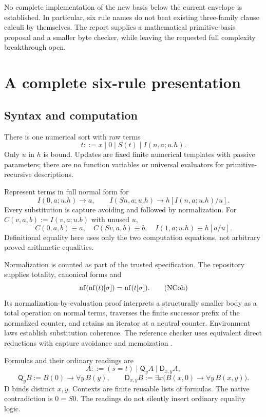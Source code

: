 \documentclass[11pt]{article}
\newcommand{\Q}{\mathsf Q}\newcommand{\D}{\mathsf D}
\begin{document}
No complete implementation of the new basis below the current envelope
is established. In particular, six rule names do not beat existing
three-family clause calculi by themselves. The report supplies a
mathematical primitive-basis proposal and a smaller byte checker, while
leaving the requested full complexity breakthrough open.




\section{A complete six-rule presentation}\label{sec:system}
\subsection{Syntax and computation}
There is one numerical sort with raw terms
\[
 t::=x\mid0\mid S(t)\mid I(n,a;u.h).
\]
Only $u$ in $h$ is bound. Updates are fixed finite numerical templates
with passive parameters; there are no function variables or universal
evaluators for primitive-recursive descriptions.

Represent terms in full normal form for
\[
 I(0,a;u.h)\longrightarrow a,\qquad
 I(Sn,a;u.h)\longrightarrow h[I(n,a;u.h)/u].
 \tag{Comp}\label{eq:comp}
\]
Every substitution is capture avoiding and followed by normalization.
For $C(v,a,b):=I(v,a;u.b)$ with unused $u$,
\[
 C(0,a,b)\equiv a,\quad C(Sv,a,b)\equiv b,\quad
 I(1,a;u.h)\equiv h[a/u].
\]
Definitional equality here uses only the two computation equations,
not arbitrary proved arithmetic equalities.

Normalization is counted as part of the trusted specification.
The repository supplies totality, canonical forms and
\[
 \operatorname{nf}(\operatorname{nf}(t)[\sigma])=\operatorname{nf}(t[\sigma]).                    \tag{NCoh}
\]
Its normalization-by-evaluation proof interprets a structurally smaller
body as a total operation on normal terms, traverses the finite
successor prefix of the normalized counter, and retains an iterator at
a neutral counter. Environment laws establish substitution coherence.
The reference checker uses equivalent direct reductions with capture
avoidance and memoization \cite{normalization,current}.

Formulas and their ordinary readings are
\[
 A::=(s=t)\mid\Q_yA\mid\D_{x,y}A,
\]
\[
 \Q_yB:=B(0)\to\forall y\,B(y),\qquad
 \D_{x,y}B:=\exists x\bigl(B(x,0)\to\forall y\,B(x,y)\bigr).
 \tag{Read}\label{eq:read}
\]
D binds distinct $x,y$. Contexts are finite reusable lists of formulas.
The native contradiction is $0=S0$. The readings do not silently insert
ordinary equality logic.
\end{document}
